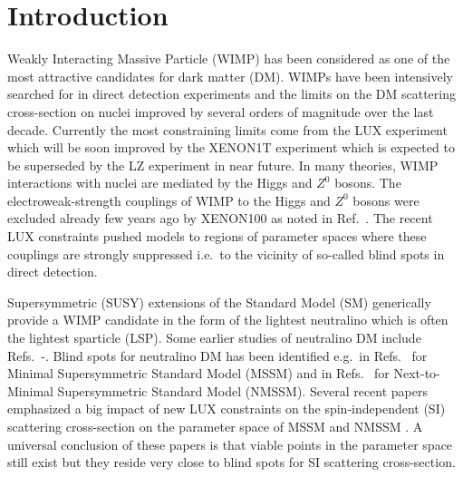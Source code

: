 \documentclass[12pt,twoside]{article}
\begin{document}
 




\newpage

\section{Introduction}


Weakly Interacting Massive Particle (WIMP) has been considered as one of 
the most attractive candidates for dark matter (DM). WIMPs have been
intensively searched for in direct detection experiments and the limits 
on the DM scattering cross-section on nuclei improved by several orders of
magnitude over the last decade. Currently the most constraining limits 
come from the LUX \cite{LUX2016} experiment which will be soon improved by the
XENON1T \cite{Xenon1T} experiment which is expected to be superseded 
by the LZ \cite{LZ} experiment in near future. In many theories, WIMP 
interactions with nuclei are mediated by the Higgs and $Z^0$ bosons. 
The electroweak-strength couplings of WIMP to the Higgs and $Z^0$ bosons 
were excluded already few years ago by XENON100 \cite{Xenon100} as noted 
in Ref.~\cite{bs_Hall}. The recent LUX constraints pushed models to regions 
of parameter spaces where these couplings are strongly suppressed i.e.~to 
the vicinity of so-called blind spots in direct detection.


Supersymmetric (SUSY) extensions of the Standard Model (SM) generically 
provide a WIMP candidate in the form of the lightest neutralino which is 
often the lightest sparticle (LSP). Some earlier studies of neutralino DM 
include Refs.~\cite{Ellwanger:2014dfa}-\cite{well-tempered}.
 Blind spots for neutralino DM has been identified e.g.~in 
Refs.~\cite{bs_Hall,bs_Wagner,bs_Crivellin,Han:2016qtc} for 
Minimal Supersymmetric Standard Model (MSSM)
and in Refs.~\cite{BS_NMSSM,Cheung:2014lqa} for 
Next-to-Minimal Supersymmetric Standard Model (NMSSM). 
Several recent papers emphasized a big impact of new LUX constraints on 
the spin-independent (SI) scattering cross-section on the parameter space
 of MSSM \cite{welltemperedBOS,Huang:2017kdh} and NMSSM
\cite{Cao:2016cnv,Ellwanger:2016sur,Beskidt:2017xsd}. A universal conclusion 
of these papers is that viable points in the parameter space still exist but
they reside very close to blind spots for SI scattering cross-section. 
\end{document}
